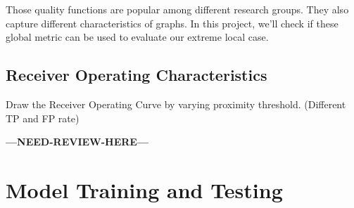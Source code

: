 \documentclass[11pt,a4paper]{article}
\newcommand{\question}{\textbf{---NEED-REVIEW-HERE---}}
\begin{document}
	Those quality functions are popular among different research 
	groups. They also capture different characteristics of graphs. 
	In this project, we'll check if these global metric can 
	be used to evaluate our extreme local case. 


\subsection{Receiver Operating Characteristics}

Draw the Receiver Operating Curve by varying proximity threshold. 
			(Different TP and FP rate)




\question


\section{Model Training and Testing}


%
%
%

%
%
%
%

%
%
%
\end{document}
